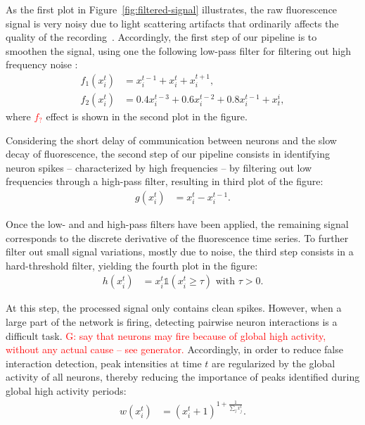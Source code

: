 \documentclass[wcp]{jmlr}
\begin{document}
As the first plot in Figure~\ref{fig:filtered-signal} illustrates, the raw
fluorescence signal is very noisy due to light scattering artifacts that
ordinarily affects the quality of the recording~\citep{lichtman2011big}.
Accordingly, the first step of our pipeline is to smoothen the signal, using
one the following low-pass filter for filtering out high frequency noise :
\begin{align}
f_1(x^t_i) &= x^{t-1}_i + x^{t}_i + x^{t+1}_i \label{eq:symetric-median}, \\
f_2(x^t_i) &= 0.4 x^{t-3}_i + 0.6 x^{t-2}_i + 0.8 x^{t-1}_i + x_{t}^i,
\label{eq:weighted-asymetric-median}
\end{align}
where \textcolor{red}{$f_?$} effect is shown in the second plot in the figure.

Considering the short delay of communication between neurons and the slow
decay of fluorescence, the second step of our pipeline consists in identifying
neuron spikes -- characterized by high frequencies -- by filtering out low
frequencies through a high-pass filter, resulting in third plot of the figure:
\begin{align} %
g(x^{t}_{i}) &= x^{t}_i - x^{t-1}_i. \label{eq:high-pass-filter}
\end{align}

Once the low- and and high-pass filters have been applied, the remaining signal
corresponds to the discrete derivative of the fluorescence time series. To
further filter out small signal variations, mostly due to noise, the third step
consists in a  hard-threshold filter, yielding the fourth plot in the figure:
\begin{align}
h(x^{t}_i) &= x^{t}_i \mathbb{1}(x^{t}_i \geq \tau) \text{ with } \tau > 0.
\end{align}

At this step, the processed signal only contains clean spikes. However, when a
large part of the network is firing, detecting pairwise neuron interactions is a
difficult task. \textcolor{red}{G: say that neurons may fire because of global
high activity, without any actual cause -- see generator.}
Accordingly, in order to reduce false interaction detection,
peak intensities at time $t$ are regularized by the global activity of all
neurons, thereby reducing the importance of peaks identified during global high activity periods:
\begin{align}
 w(x^{t}_i) &= (x^{t}_i + 1 )^{1 + \frac{1}{\sum_{j} x^{t}_j}}.
\end{align}
\end{document}
